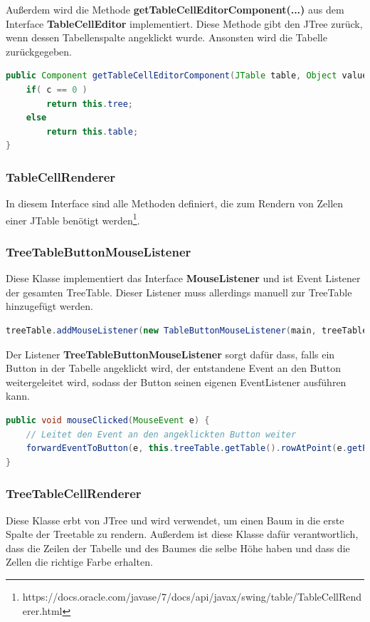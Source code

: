 Außerdem wird die Methode \textbf{getTableCellEditorComponent(...)} aus dem Interface \textbf{TableCellEditor} implementiert. Diese Methode gibt den JTree zurück, wenn dessen Tabellenspalte angeklickt wurde. Ansonsten wird die Tabelle zurückgegeben.
\begin{lstlisting}[language=JAVA]
public Component getTableCellEditorComponent(JTable table, Object value, boolean isSelected, int r, int c) {
    if( c == 0 )
        return this.tree;
    else
        return this.table;
}
\end{lstlisting}

\subsubsection*{TableCellRenderer}
In diesem Interface sind alle Methoden definiert, die zum Rendern von Zellen einer JTable benötigt werden\footnote{https://docs.oracle.com/javase/7/docs/api/javax/swing/table/TableCellRenderer.html}.

\subsubsection*{TreeTableButtonMouseListener}
Diese Klasse implementiert das Interface \textbf{MouseListener} und ist Event Listener der gesamten TreeTable. Dieser Listener muss allerdings manuell zur TreeTable hinzugefügt werden.
\begin{lstlisting}[language=JAVA]
treeTable.addMouseListener(new TableButtonMouseListener(main, treeTable));
\end{lstlisting}

Der Listener \textbf{TreeTableButtonMouseListener} sorgt dafür dass, falls ein Button in der Tabelle angeklickt wird, der entstandene Event an den Button weitergeleitet wird, sodass der Button seinen eigenen EventListener ausführen kann.
\begin{lstlisting}[language=JAVA]
public void mouseClicked(MouseEvent e) {
	// Leitet den Event an den angeklickten Button weiter
	forwardEventToButton(e, this.treeTable.getTable().rowAtPoint(e.getPoint()), this.treeTable.getTable().columnAtPoint(e.getPoint()));
}
\end{lstlisting}

\subsubsection*{TreeTableCellRenderer}
Diese Klasse erbt von JTree und wird verwendet, um einen Baum in die erste Spalte der Treetable zu rendern. Außerdem ist diese Klasse dafür verantwortlich, dass die Zeilen der Tabelle und des Baumes die selbe Höhe haben und dass die Zellen die richtige Farbe erhalten.

